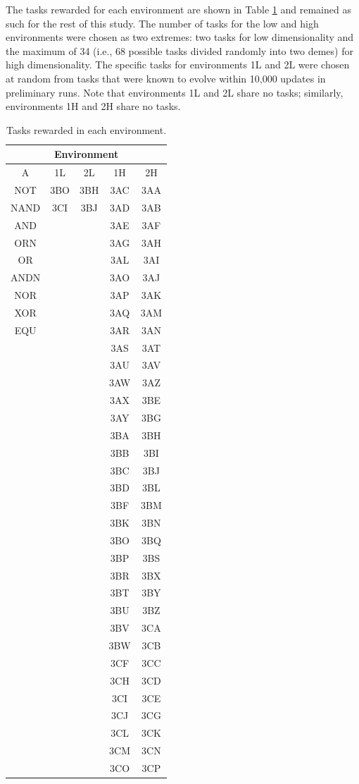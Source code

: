 \begin{doublespace}
The tasks rewarded for each environment
are shown in Table \ref{table:env}
and remained as such for the rest of this study.
%
The number of tasks for the low and high environments
were chosen as two extremes: two tasks for low dimensionality
and the maximum of 34 (i.e., 68 possible tasks divided randomly
into two demes) for high dimensionality.
%
The specific tasks for environments 1L and 2L were chosen at random
from tasks that were known to evolve within 10,000 updates in preliminary runs.
%
Note that environments 1L and 2L share no tasks;
similarly, environments 1H and 2H share no tasks.

\begin{table}
\centering
\begin{tabular}{ccccc}
\hline
\multicolumn{5}{c}{Environment} \\
\hline
A & 1L & 2L & 1H & 2H \\
\hline
NOT&3BO&3BH&3AC&3AA \\
NAND&3CI&3BJ&3AD&3AB \\
AND&&&3AE&3AF \\
ORN&&&3AG&3AH \\
OR&&&3AL&3AI \\
ANDN&&&3AO&3AJ \\
NOR&&&3AP&3AK \\
XOR&&&3AQ&3AM \\
EQU&&&3AR&3AN \\
&&&3AS&3AT \\
&&&3AU&3AV \\
&&&3AW&3AZ \\
&&&3AX&3BE \\
&&&3AY&3BG \\
&&&3BA&3BH \\
&&&3BB&3BI \\
&&&3BC&3BJ \\
&&&3BD&3BL \\
&&&3BF&3BM \\
&&&3BK&3BN \\
&&&3BO&3BQ \\
&&&3BP&3BS \\
&&&3BR&3BX \\
&&&3BT&3BY \\
&&&3BU&3BZ \\
&&&3BV&3CA \\
&&&3BW&3CB \\
&&&3CF&3CC \\
&&&3CH&3CD \\
&&&3CI&3CE \\
&&&3CJ&3CG \\
&&&3CL&3CK \\
&&&3CM&3CN \\
&&&3CO&3CP \\
\hline
\end{tabular}
\caption{Tasks rewarded in each environment.}
\label{table:env}
\end{table}




\end{doublespace}
